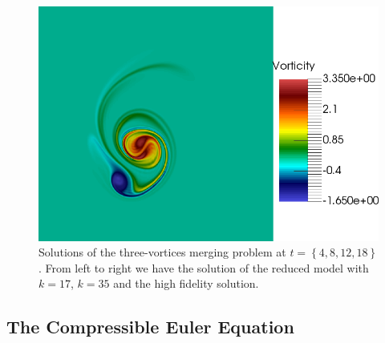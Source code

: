 \begin{figure}[h!]
\includegraphics[scale=0.06]{data/Incompressible_Euler/Snapshots/Full_5.png}

\caption{Solutions of the three-vortices merging problem at $t=\left\{ 4,8,12,18 \right\}$. From left to right we have the solution of the reduced model with $k=17$, $k=35$ and the high fidelity solution.}
\label{fig:snap_solution_incompressible_Euler}
\end{figure}

\subsection{The Compressible Euler Equation}

